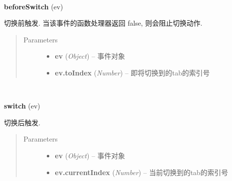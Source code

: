 \documentclass[letterpaper,10pt,english]{sphinxmanual}
\begin{document}
\begin{fulllineitems}
\label{api/component/switchable/switchable:Switchable.beforeSwitch}~
\begin{DUlineblock}{0em}
\item[] \textbf{beforeSwitch} (ev)
\item[] 切换前触发. 当该事件的函数处理器返回 false, 则会阻止切换动作.
\end{DUlineblock}
\begin{quote}\begin{description}
\item[{Parameters}] \leavevmode\begin{itemize}
\item {}
\textbf{ev} (\emph{Object}) -- 事件对象

\item {}
\textbf{ev.toIndex} (\emph{Number}) -- 即将切换到的tab的索引号

\end{itemize}

\end{description}\end{quote}

\end{fulllineitems}



\begin{fulllineitems}
\label{api/component/switchable/switchable:Switchable.switch}~
\begin{DUlineblock}{0em}
\item[] \textbf{switch} (ev)
\item[] 切换后触发.
\end{DUlineblock}
\begin{quote}\begin{description}
\item[{Parameters}] \leavevmode\begin{itemize}
\item {}
\textbf{ev} (\emph{Object}) -- 事件对象

\item {}
\textbf{ev.currentIndex} (\emph{Number}) -- 当前切换到的tab的索引号

\end{itemize}

\end{description}\end{quote}

\end{fulllineitems}
\end{document}
